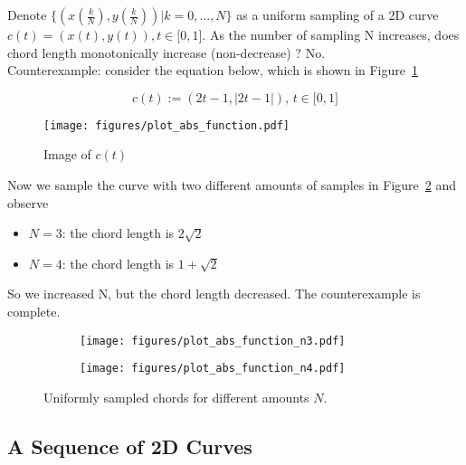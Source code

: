 \documentclass{scrartcl}
\begin{document}
Denote $\{(x(\frac{k}{N}), y(\frac{k}{N}))|k=0,...,N\}$ as a uniform sampling of a 2D curve
$c(t) = (x(t), y(t)), t \in \big[0,1\big]$. As the number of sampling N increases, does chord length monotonically
increase (non-decrease) ? No. \\
Counterexample: consider the equation below, which is shown in Figure~\ref{fig:abs}

\begin{equation}
c(t):=(2t-1, |2t-1|),\, t	\in \big[0,1\big]
\end{equation}

\begin{figure}[h]
	\centering
	\texttt{[image: figures/plot\_abs\_function.pdf]}
	\caption{Image of $c(t)$}
	\label{fig:abs}
\end{figure}

Now we sample the curve with two different amounts of samples in Figure~\ref{fig:sampled_abs} and observe
\begin{itemize}
	\item $N=3$: the chord length is $2\sqrt{2}$
	\item $N=4$: the chord length is $1 + \sqrt{2}$
\end{itemize}
So we increased N, but the chord length decreased. The counterexample is complete.

\begin{figure}[h]
	\begin{subfigure}{0.49\textwidth}
	\texttt{[image: figures/plot\_abs\_function\_n3.pdf]}
	\end{subfigure}
	\begin{subfigure}{0.49\textwidth}
	\texttt{[image: figures/plot\_abs\_function\_n4.pdf]}
	\end{subfigure}
	\caption{Uniformly sampled chords for different amounts $N$.}\label{fig:sampled_abs}
\end{figure}
\subsection{A Sequence of 2D Curves}
	
\end{document}

